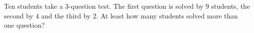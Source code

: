 Ten students take a $3$-question test. The first question is solved by $9$ students, the second by $4$ and the third by $2$. At least how many students solved more than one question?
